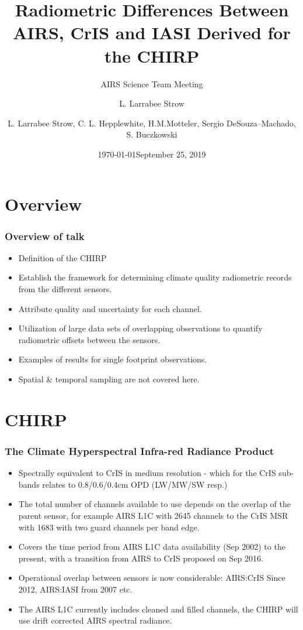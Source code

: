 \documentclass[10pt,t]{beamer}
\author{L. Larrabee Strow}
\date{\today}
\title{\large Radiometric Differences Between \newline
 AIRS, CrIS and IASI Derived for the  \newline
  CHIRP}
\subtitle{\footnotesize{AIRS Science Team Meeting}}
\date{\vspace{0.1in}\footnotesize{September 25, 2019 \vfill}}
\author{L. Larrabee Strow\inst{1,2}, C. L. Hepplewhite\inst{1,2}, H.M.Motteler\inst{1,2}, Sergio DeSouza--Machado\inst{1,2}, S. Buczkowski\inst{1,2}}
\institute[UMBC]{\inst{1} UMBC Physics Dept. \and \inst{2}UMBC JCET}
\begin{document}
\maketitle
{}

\section{Overview}
\begin{frame}
  \frametitle{Overview of talk}
  \begin{itemize}
  \item Definition of the CHIRP
  \item Establish the framework for determining climate quality radiometric records from the different sensors.
  \item Attribute quality and uncertainty for each channel.
  \item Utilization of large data sets of overlapping observations to quantify radiometric offsets between the sensors.
  \item Examples of results for single footprint observations.
  \item Spatial \& temporal sampling are not covered here.
    
  \end{itemize}
\end{frame}

\section{CHIRP}
\begin{frame}
  \frametitle{The Climate Hyperspectral Infra-red Radiance Product}
  \begin{itemize}
  \item Spectrally equivalent to CrIS in medium resolution - which for the CrIS sub-bands relates to 0.8/0.6/0.4cm OPD (LW/MW/SW resp.)
  \item The total number of channels available to use depends on the overlap of the parent sensor, for example AIRS L1C with 2645 channels to the CrIS MSR with 1683 with two guard channels per band edge.
  \item Covers the time period from AIRS L1C data availability (Sep 2002) to the present, with a transition from AIRS to CrIS proposed on Sep 2016.
  \item Operational overlap between sensors is now considerable: AIRS:CrIS Since 2012, AIRS:IASI from 2007 etc.
  \item The AIRS L1C currently includes cleaned and filled channels, the CHIRP will use drift corrected AIRS spectral radiance.
    
  \end{itemize}
\end{frame}
\end{document}
